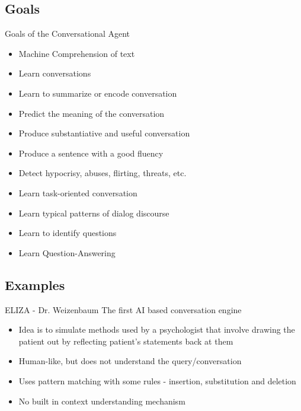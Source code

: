 \subsection{Goals}
\begin{frame}{Goals of the Conversational Agent}
\begin{itemize}
\item Machine Comprehension of text
\item Learn conversations
\item Learn to summarize or encode conversation
\item Predict the meaning of the conversation
\item Produce substantiative and useful conversation
\item Produce a sentence with a good fluency
\item Detect hypocrisy, abuses, flirting, threats, etc.
\item Learn task-oriented conversation
\item Learn typical patterns of dialog discourse
\item Learn to identify questions
\item Learn Question-Answering
\end{itemize}

\end{frame}

\subsection{Examples}
\begin{frame}{ELIZA - Dr. Weizenbaum}
The first AI based conversation engine
\begin{itemize}
	\item Idea is to simulate methods used by a psychologist that involve drawing the patient out by reflecting patient's statements back at them
	\item Human-like, but does not understand the query/conversation
	\item Uses pattern matching with some rules - insertion, substitution and deletion
	\item No built in context understanding mechanism

\end{itemize}
\end{frame}

